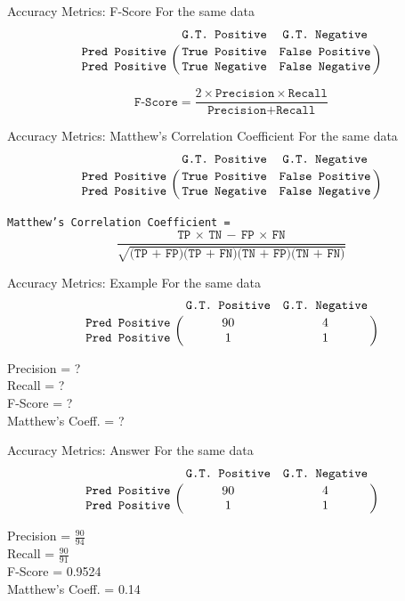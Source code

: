 \documentclass[usenames,dvipsnames]{beamer}
\begin{document}
\begin{frame}{Accuracy Metrics: F-Score}
For the same data
$$
\bordermatrix{&\texttt{G.T. Positive}&\texttt{G.T. Negative}\cr
               \texttt{Pred Positive}&\texttt{True Positive}&\texttt{False Positive}\cr
               \texttt{Pred Positive}&\texttt{True Negative}&\texttt{False Negative}}
$$

$$
\texttt{F-Score} = \frac{2\times\texttt{Precision}\times\texttt{Recall}}{\texttt{Precision} + \texttt{Recall}}
$$


\end{frame}


\begin{frame}{Accuracy Metrics: Matthew's Correlation Coefficient}
For the same data
$$
\bordermatrix{&\texttt{G.T. Positive}&\texttt{G.T. Negative}\cr
               \texttt{Pred Positive}&\texttt{True Positive}&\texttt{False Positive}\cr
               \texttt{Pred Positive}&\texttt{True Negative}&\texttt{False Negative}}
$$

\texttt{Matthew's Correlation Coefficient =}
$$
\frac{\texttt{TP $\times$ TN} - \texttt{FP $\times$ FN}}{\sqrt{\texttt{(TP + FP)(TP + FN)(TN + FP)(TN + FN)}}}
$$
\end{frame}

\begin{frame}{Accuracy Metrics: Example}
For the same data
$$
\bordermatrix{&\texttt{G.T. Positive}&\texttt{G.T. Negative}\cr
               \texttt{Pred Positive}&90&4\cr
               \texttt{Pred Positive}&1&1}
$$

Precision = ?  \\
Recall = ?\\
F-Score = ?\\
Matthew's Coeff. = ?\\
\end{frame}

\begin{frame}{Accuracy Metrics: Answer}
For the same data
$$
\bordermatrix{&\texttt{G.T. Positive}&\texttt{G.T. Negative}\cr
               \texttt{Pred Positive}&90&4\cr
               \texttt{Pred Positive}&1&1}
$$

Precision = $\frac{90}{94}$ \\
Recall = $\frac{90}{91}$ \\
F-Score = 0.9524 \\
Matthew's Coeff. = 0.14
\end{frame}




%
%
\end{document}
